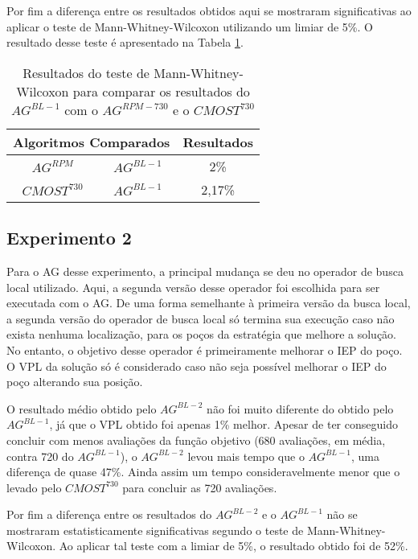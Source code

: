 Por fim a diferença entre os resultados obtidos aqui se mostraram significativas ao aplicar o teste de Mann-Whitney-Wilcoxon utilizando um limiar de 5\%. O resultado desse teste é apresentado na Tabela \ref{tab:mw6_2}.

\begin{table}[htb]
\centering
\caption{Resultados do teste de Mann-Whitney-Wilcoxon para comparar os resultados do $AG^{BL-1}$ com o $AG^{RPM-730}$ e o $CMOST^{730}$}
\label{tab:mw6_2}
\begin{tabular}{|c|c|c|}
\hline
\multicolumn{2}{|c|}{Algoritmos Comparados} & Resultados \\ \hline
$AG^{RPM}$  &  $AG^{BL-1}$ & 2\% \\ \hline
$CMOST^{730}$ & $AG^{BL-1}$ & 2,17\% \\ \hline

\end{tabular}
\end{table}

\subsection{Experimento 2}
\label{ch:5_Experimento7}
Para o AG desse experimento, a principal mudança se deu no operador de busca local utilizado. Aqui, a segunda versão desse operador foi escolhida para ser executada com o AG. De uma forma semelhante à primeira versão da busca local, a segunda versão do operador de busca local só termina sua execução caso não exista nenhuma localização, para os poços da estratégia que melhore a solução. No entanto, o objetivo desse operador é primeiramente melhorar o IEP do poço. O VPL da solução só é considerado caso não seja possível melhorar o IEP do poço alterando sua posição.

O resultado médio obtido pelo $AG^{BL-2}$ não foi muito diferente do obtido pelo $AG^{BL-1}$, já que o VPL obtido foi apenas 1\% melhor. Apesar de ter conseguido concluir com menos avaliações da função objetivo (680 avaliações, em média, contra 720 do $AG^{BL-1}$), o $AG^{BL-2}$ levou mais tempo que o $AG^{BL-1}$, uma diferença de quase 47\%. Ainda assim um tempo consideravelmente menor que o levado pelo $CMOST^{730}$ para concluir as 720 avaliações.

Por fim a diferença entre os resultados do $AG^{BL-2}$ e o $AG^{BL-1}$ não se mostraram estatisticamente significativas segundo o teste de Mann-Whitney-Wilcoxon. Ao aplicar tal teste com a limiar de 5\%, o resultado obtido foi de 52\%.